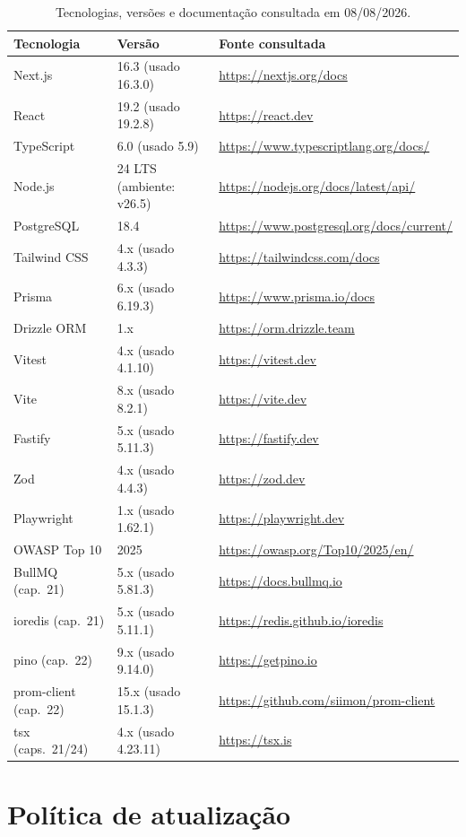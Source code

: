 \begin{table}[h]
\centering
\small
\caption{Tecnologias, versões e documentação consultada em 08/08/2026.}
\label{tab:versoes}
\begin{tabularx}{\textwidth}{@{}l l X@{}}
\toprule
\textbf{Tecnologia} & \textbf{Versão} & \textbf{Fonte consultada} \\
\midrule
Next.js & 16.3 (usado 16.3.0) & \url{https://nextjs.org/docs} \\
React & 19.2 (usado 19.2.8) & \url{https://react.dev} \\
TypeScript & 6.0 (usado 5.9) & \url{https://www.typescriptlang.org/docs/} \\
Node.js & 24 LTS (ambiente: v26.5) & \url{https://nodejs.org/docs/latest/api/} \\
PostgreSQL & 18.4 & \url{https://www.postgresql.org/docs/current/} \\
Tailwind CSS & 4.x (usado 4.3.3) & \url{https://tailwindcss.com/docs} \\
Prisma & 6.x (usado 6.19.3) & \url{https://www.prisma.io/docs} \\
Drizzle ORM & 1.x & \url{https://orm.drizzle.team} \\
Vitest & 4.x (usado 4.1.10) & \url{https://vitest.dev} \\
Vite & 8.x (usado 8.2.1) & \url{https://vite.dev} \\
Fastify & 5.x (usado 5.11.3) & \url{https://fastify.dev} \\
Zod & 4.x (usado 4.4.3) & \url{https://zod.dev} \\
Playwright & 1.x (usado 1.62.1) & \url{https://playwright.dev} \\
OWASP Top 10 & 2025 & \url{https://owasp.org/Top10/2025/en/} \\
BullMQ (cap.~21) & 5.x (usado 5.81.3) & \url{https://docs.bullmq.io} \\
ioredis (cap.~21) & 5.x (usado 5.11.1) & \url{https://redis.github.io/ioredis} \\
pino (cap.~22) & 9.x (usado 9.14.0) & \url{https://getpino.io} \\
prom-client (cap.~22) & 15.x (usado 15.1.3) & \url{https://github.com/siimon/prom-client} \\
tsx (caps.~21/24) & 4.x (usado 4.23.11) & \url{https://tsx.is} \\
\bottomrule
\end{tabularx}
\end{table}

\section{Política de atualização}

